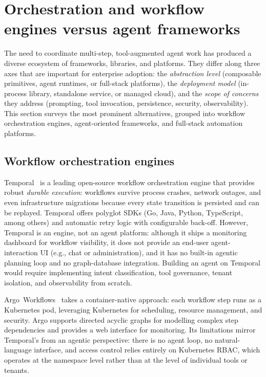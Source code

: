 \documentclass[a4paper,noexaminfo]{sapthesis}
\begin{document}
\section{Orchestration and workflow engines versus agent frameworks}
\label{sec:orchestration-frameworks}

The need to coordinate multi-step, tool-augmented agent work has produced a
diverse ecosystem of frameworks, libraries, and platforms.  They differ
along three axes that are important for enterprise adoption: the
\emph{abstraction level} (composable primitives, agent runtimes, or
full-stack platforms), the \emph{deployment model} (in-process library,
standalone service, or managed cloud), and the \emph{scope of concerns}
they address (prompting, tool invocation, persistence, security,
observability).  This section surveys the most prominent alternatives,
grouped into workflow orchestration engines, agent-oriented frameworks, and
full-stack automation platforms.

\subsection{Workflow orchestration engines}

Temporal~\cite{temporal2023} is a leading open-source workflow orchestration
engine that provides robust \emph{durable execution}: workflows
survive process crashes, network outages, and even infrastructure
migrations because every state transition is persisted and can be replayed.
Temporal offers polyglot SDKs (Go, Java, Python, TypeScript, among others)
and automatic retry logic with configurable back-off.  However, Temporal is
an engine, not an agent platform: although it ships a monitoring dashboard
for workflow visibility, it does not provide an end-user agent-interaction
UI (e.g., chat or administration), and it has no built-in agentic planning
loop and no graph-database integration.  Building an
agent on Temporal would require implementing intent classification, tool
governance, tenant isolation, and observability from scratch.

Argo~Workflows~\cite{argoworkflows2023} takes a container-native approach:
each workflow step runs as a Kubernetes pod, leveraging Kubernetes for
scheduling, resource management, and security.  Argo supports directed
acyclic graphs for modelling complex step dependencies and provides a web
interface for monitoring.  Its limitations mirror Temporal's from an
agentic perspective: there is no agent loop, no natural-language interface,
and access control relies entirely on Kubernetes RBAC, which operates at
the namespace level rather than at the level of individual tools or
tenants.
\end{document}
